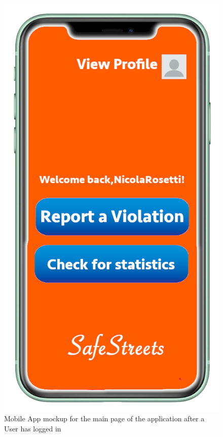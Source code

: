 \documentclass[a4paper]{report}
\begin{document}
{\begin{figure}
\begin{minipage}{.45\textwidth}
\includegraphics[width=.7\linewidth]{../RASD/img/mockups/Schermata_principale.png}
\caption[Mobile App mockup for main page]{Mobile App mockup for the main page of the application after a User has logged in }
\label{fig:main-screen}
\end{minipage}\hfill
\end{figure}
\begin{figure}
\begin{minipage}{.45\textwidth}
\centering

\end{minipage}
\end{figure}}
\end{document}
